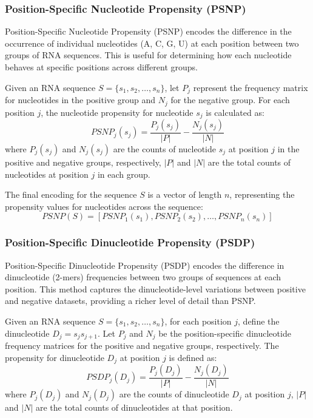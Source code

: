     \subsubsection{Position-Specific Nucleotide Propensity (PSNP)}\label{subsubsec:PSNP}
      Position-Specific Nucleotide Propensity (PSNP) encodes the difference in the occurrence of individual nucleotides (A, C, G, U) at each position between two groups of RNA sequences.
      This is useful for determining how each nucleotide behaves at specific positions across different groups.

      Given an RNA sequence $S = \{s_1, s_2, \dots, s_n\}$, let $P_j$ represent the frequency matrix for nucleotides in the positive group and $N_j$ for the negative group.
      For each position $j$, the nucleotide propensity for nucleotide $s_j$ is calculated as:
      \[
        PSNP_j(s_j) = \frac{P_j(s_j)}{|P|} - \frac{N_j(s_j)}{|N|}
      \]
      where $P_j(s_j)$ and $N_j(s_j)$ are the counts of nucleotide $s_j$ at position $j$ in the positive and negative groups, respectively, $|P|$ and $|N|$ are the total counts of nucleotides at position $j$ in each group.

      The final encoding for the sequence $S$ is a vector of length $n$, representing the propensity values for nucleotides across the sequence:
      \[
        PSNP(S) = [PSNP_1(s_1), PSNP_2(s_2), \dots, PSNP_n(s_n)]
      \]

    \subsubsection{Position-Specific Dinucleotide Propensity (PSDP)}\label{subsubsec:PSDP}
      Position-Specific Dinucleotide Propensity (PSDP) encodes the difference in dinucleotide (2-mers) frequencies between two groups of sequences at each position.
      This method captures the dinucleotide-level variations between positive and negative datasets, providing a richer level of detail than PSNP.

      Given an RNA sequence $S = \{s_1, s_2, \dots, s_n\}$, for each position $j$, define the dinucleotide $D_j = s_j s_{j+1}$.
      Let $P_j$ and $N_j$ be the position-specific dinucleotide frequency matrices for the positive and negative groups, respectively.
      The propensity for dinucleotide $D_j$ at position $j$ is defined as:
      \[
        PSDP_j(D_j) = \frac{P_j(D_j)}{|P|} - \frac{N_j(D_j)}{|N|}
      \]
      where $P_j(D_j)$ and $N_j(D_j)$ are the counts of dinucleotide $D_j$ at position $j$, $|P|$ and $|N|$ are the total counts of dinucleotides at that position.

